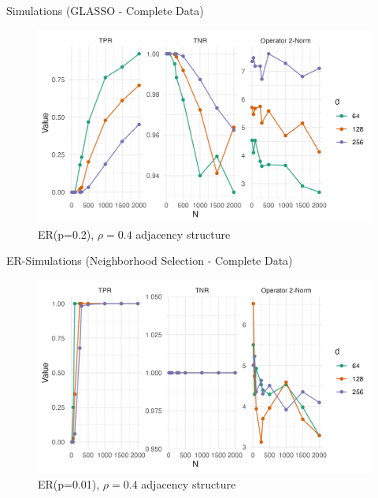 \documentclass{beamer}
\begin{document}
\begin{frame}{Simulations (GLASSO - Complete Data)}
    \begin{figure}
        \centering 
        \includegraphics[scale=0.65]{glasso_complete_ER_FixN_2.png}
        \caption{ER(p=0.2), $\rho=0.4$ adjacency structure}
    \end{figure}
\end{frame}



\begin{frame}{ER-Simulations (Neighborhood Selection - Complete Data)}
    \begin{figure}
        \centering 
        \includegraphics[scale=0.65]{glasso_complete_ERmb_FixN_01.png}
        \caption{ER(p=0.01), $\rho=0.4$ adjacency structure}
    \end{figure}
\end{frame}
\end{document}
